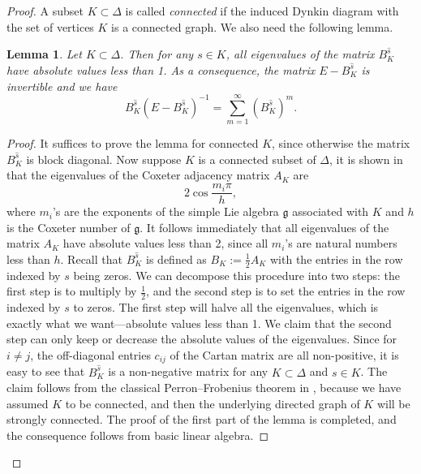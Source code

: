 \documentclass[11pt, letterpaper]{amsart}
\numberwithin{equation}{section}
\newtheorem{lemma}[theorem]{Lemma}
\begin{document}
\begin{proof}
A subset $K \subset \Delta$ is called \emph{connected} if the induced Dynkin diagram with the set of vertices $K$ is a connected graph. We also need the following lemma.

\begin{lemma}\label{lem: convergence of matrix series} Let $K\subset\Delta$. Then for any $s\in K$,  all eigenvalues of the matrix $B_K^{\widehat{s}}$ have absolute values less than 1. As a consequence, the matrix $E-B_K^{\widehat{s}}$ is invertible and we have
    \begin{equation}\label{eq-convergence}
        B_K^{\widehat{s}}\left(E-B_K^{\widehat{s}}\right)^{-1}=\sum_{m=1}^{\infty}\left(B_K^{\widehat{s}}\right)^m.
    \end{equation}
\end{lemma}
\begin{proof}
    It suffices to prove the lemma for connected $K$, since otherwise the matrix $B_K^{\widehat{s}}$ is block diagonal. Now suppose $K$ is a connected subset of $\Delta$, it is shown in \cite[Lemma 2]{damianou2014characteristicpolynomialcartanmatrices} that the eigenvalues of the Coxeter adjacency matrix $A_{K}$ are
    \[2\cos{\frac{m_i\pi }{h}},\]
    where $m_i$'s are the exponents of the simple Lie algebra $\mathfrak{g}$ associated with $K$ and $h$ is the Coxeter number of $\mathfrak{g}$. It follows immediately that all eigenvalues of the matrix $A_K$
    have absolute values less than 2, since all $m_i$'s are natural numbers less than $h$. Recall that $B_K^{\widehat{s}}$ is defined as $B_K:=\frac{1}{2}A_K$ with the entries in the row indexed by $s$ being zeros. 
    We can decompose this procedure into two steps: the first step is to multiply by $\frac{1}{2}$, and the second step is to set the entries in the row indexed by $s$ to zeros. The first step will halve all the eigenvalues, which is exactly what we want---absolute values less than 1. We claim that the second step can only keep or decrease the absolute values of the eigenvalues. Since for $i\neq j$, the off-diagonal entries $c_{ij}$ of the Cartan matrix are all non-positive, it is easy to see that $B_K^{\widehat{s}}$ is a non-negative matrix for any $K\subset\Delta$ and $s\in K$. The claim follows from the classical Perron--Frobenius theorem in \cite[Theorem 8.8.1(b)]{algebraicgraphtheoryperronfreobenius}, because we have assumed $K$ to be connected, and then the underlying directed graph of $K$ will be strongly connected. The proof of the first part of the lemma is completed, and the consequence follows from basic linear algebra.
\end{proof}


\end{proof}
\end{document}
